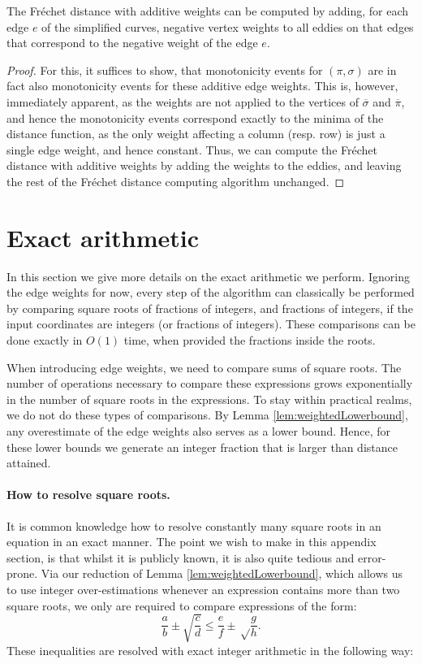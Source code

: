 \documentclass[english, thm-restate, notab]{lipics-v2021}
\begin{document}
\begin{lemma}
    The Fréchet distance with additive weights can be computed by adding, for each edge $e$ of the simplified curves, negative vertex weights to all eddies on that edges that correspond to the negative weight of the edge $e$. 
\end{lemma}
\begin{proof}
    For this, it suffices to show, that monotonicity events for $(\pi, \sigma)$ are in fact also monotonicity events for these additive edge weights. This is, however, immediately apparent, as the weights are not applied to the vertices of $\overline{\sigma}$ and $\overline{\pi}$, and hence the monotonicity events correspond exactly to the minima of the distance function, as the only weight affecting a column (resp. row) is just a single edge weight, and hence constant. Thus, we can compute the Fréchet distance with additive weights by adding the weights to the eddies, and leaving the rest of the Fréchet distance computing algorithm unchanged.
\end{proof}




\section{Exact arithmetic}
\label{sec:exact}
    In this section we give more details on the exact arithmetic we perform. Ignoring the edge weights for now, every step of the algorithm can classically be performed by comparing square roots of fractions of integers, and fractions of integers, if the input coordinates are integers (or fractions of integers). These comparisons can be done exactly in $O(1)$ time, when provided the fractions inside the roots.

    When introducing edge weights, we need to compare sums of square roots. The number of operations necessary to compare these expressions grows exponentially in the number of square roots in the expressions. To stay within practical realms, we do not do these types of comparisons. By Lemma \ref{lem:weightedLowerbound}, any overestimate of the edge weights also serves as a lower bound. Hence, for these lower bounds we generate an integer fraction that is larger than distance attained.
    
    
    \paragraph*{How to resolve square roots.}
    It is common knowledge how to resolve constantly many square roots in an equation in an exact manner.
    The point we wish to make in this appendix section, is that whilst it is publicly known, it is also quite tedious and error-prone.
    Via our reduction of Lemma \ref{lem:weightedLowerbound}, which allows us to use integer over-estimations whenever an expression contains more than two square roots, we only are required to compare expressions of the form:  \[\frac{a}{b}\pm\sqrt{\frac{c}{d}}\leq\frac{e}{f}\pm\sqrt\frac{g}{h}.\]
    These inequalities are  resolved with exact integer arithmetic in the following way:
    
\end{document}
